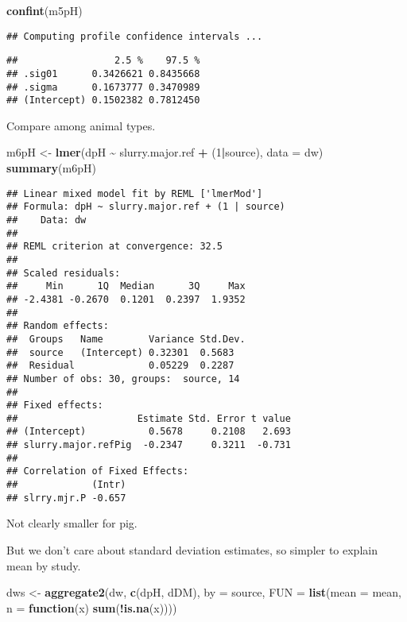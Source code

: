 \documentclass[
]{article}
\newenvironment{Shaded}{\begin{snugshade}}{\end{snugshade}}
\newcommand{\AttributeTok}[1]{\textcolor[rgb]{0.13,0.29,0.53}{#1}}
\newcommand{\ControlFlowTok}[1]{\textcolor[rgb]{0.13,0.29,0.53}{\textbf{#1}}}
\newcommand{\DecValTok}[1]{\textcolor[rgb]{0.00,0.00,0.81}{#1}}
\newcommand{\FunctionTok}[1]{\textcolor[rgb]{0.13,0.29,0.53}{\textbf{#1}}}
\newcommand{\NormalTok}[1]{#1}
\newcommand{\OtherTok}[1]{\textcolor[rgb]{0.56,0.35,0.01}{#1}}
\newcommand{\SpecialCharTok}[1]{\textcolor[rgb]{0.81,0.36,0.00}{\textbf{#1}}}
\newcommand{\StringTok}[1]{\textcolor[rgb]{0.31,0.60,0.02}{#1}}
\begin{document}
\begin{Shaded}
\begin{Highlighting}[]
\FunctionTok{confint}\NormalTok{(m5pH)}
\end{Highlighting}
\end{Shaded}

\begin{verbatim}
## Computing profile confidence intervals ...
\end{verbatim}

\begin{verbatim}
##                 2.5 %    97.5 %
## .sig01      0.3426621 0.8435668
## .sigma      0.1673777 0.3470989
## (Intercept) 0.1502382 0.7812450
\end{verbatim}

Compare among animal types.

\begin{Shaded}
\begin{Highlighting}[]
\NormalTok{m6pH }\OtherTok{\textless{}{-}} \FunctionTok{lmer}\NormalTok{(dpH }\SpecialCharTok{\textasciitilde{}}\NormalTok{ slurry.major.ref }\SpecialCharTok{+}\NormalTok{  (}\DecValTok{1}\SpecialCharTok{|}\NormalTok{source), }\AttributeTok{data =}\NormalTok{ dw)}
\FunctionTok{summary}\NormalTok{(m6pH)}
\end{Highlighting}
\end{Shaded}

\begin{verbatim}
## Linear mixed model fit by REML ['lmerMod']
## Formula: dpH ~ slurry.major.ref + (1 | source)
##    Data: dw
## 
## REML criterion at convergence: 32.5
## 
## Scaled residuals: 
##     Min      1Q  Median      3Q     Max 
## -2.4381 -0.2670  0.1201  0.2397  1.9352 
## 
## Random effects:
##  Groups   Name        Variance Std.Dev.
##  source   (Intercept) 0.32301  0.5683  
##  Residual             0.05229  0.2287  
## Number of obs: 30, groups:  source, 14
## 
## Fixed effects:
##                     Estimate Std. Error t value
## (Intercept)           0.5678     0.2108   2.693
## slurry.major.refPig  -0.2347     0.3211  -0.731
## 
## Correlation of Fixed Effects:
##             (Intr)
## slrry.mjr.P -0.657
\end{verbatim}

Not clearly smaller for pig.

But we don't care about standard deviation estimates, so simpler to
explain mean by study.

\begin{Shaded}
\begin{Highlighting}[]
\NormalTok{dws }\OtherTok{\textless{}{-}} \FunctionTok{aggregate2}\NormalTok{(dw, }\FunctionTok{c}\NormalTok{(}\StringTok{\textquotesingle{}dpH\textquotesingle{}}\NormalTok{, }\StringTok{\textquotesingle{}dDM\textquotesingle{}}\NormalTok{), }\AttributeTok{by =} \StringTok{\textquotesingle{}source\textquotesingle{}}\NormalTok{, }\AttributeTok{FUN =} \FunctionTok{list}\NormalTok{(}\AttributeTok{mean =}\NormalTok{ mean, }\AttributeTok{n =} \ControlFlowTok{function}\NormalTok{(x) }\FunctionTok{sum}\NormalTok{(}\SpecialCharTok{!}\FunctionTok{is.na}\NormalTok{(x))))}
\end{Highlighting}
\end{Shaded}
\end{document}
